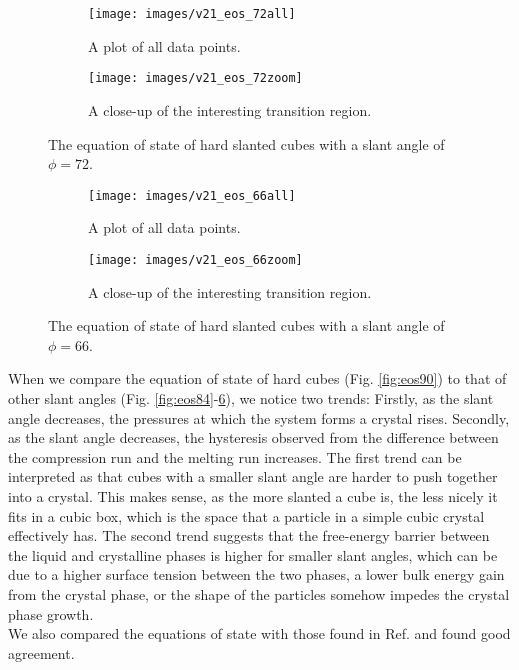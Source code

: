 \documentclass[thesis]{subfiles}
\begin{document}
\begin{figure}[h]
	\begin{subfigure}[t]{0.475\textwidth}
		\texttt{[image: images/v21\_eos\_72all]}
		\caption{A plot of all data points.}
		\label{fig:eos72-a}
	\end{subfigure}\hfill
	\begin{subfigure}[t]{0.475\textwidth}
		\texttt{[image: images/v21\_eos\_72zoom]}
		\caption{A close-up of the interesting transition region.}
		\label{fig:eos72-b}
	\end{subfigure}
	\caption{The equation of state of hard slanted cubes with a slant angle of $\phi = 72$\degr.}
	\label{fig:eos72}
\end{figure}

\begin{figure}[h]
	\begin{subfigure}[t]{0.475\textwidth}
		\texttt{[image: images/v21\_eos\_66all]}
		\caption{A plot of all data points.}
		\label{fig:eos66-a}
	\end{subfigure}\hfill
	\begin{subfigure}[t]{0.475\textwidth}
		\texttt{[image: images/v21\_eos\_66zoom]}
		\caption{A close-up of the interesting transition region.}
		\label{fig:eos66-b}
	\end{subfigure}
	\caption{The equation of state of hard slanted cubes with a slant angle of $\phi = 66$\degr.}
	\label{fig:eos66}
\end{figure}

When we compare the equation of state of hard cubes (Fig. \ref{fig:eos90}) to that of other slant angles (Fig. \ref{fig:eos84}-\ref{fig:eos66}), we notice two trends: Firstly, as the slant angle decreases, the pressures at which the system forms a crystal rises. Secondly, as the slant angle decreases, the hysteresis observed from the difference between the compression run and the melting run increases.
The first trend can be interpreted as that cubes with a smaller slant angle are harder to push together into a crystal. This makes sense, as the more slanted a cube is, the less nicely it fits in a cubic box, which is the space that a particle in a simple cubic crystal effectively has. The second trend suggests that the free-energy barrier between the liquid and crystalline phases is higher for smaller slant angles, which can be due to a higher surface tension between the two phases, a lower bulk energy gain from the crystal phase, or the shape of the particles somehow impedes the crystal phase growth.\\
We also compared the equations of state with those found in Ref. \cite{van2017phase} and found good agreement.
\end{document}
